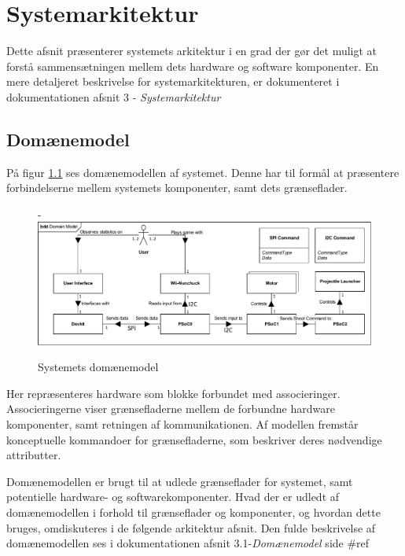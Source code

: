 \chapter{Systemarkitektur}
Dette afsnit præsenterer systemets arkitektur i en grad der gør det muligt at forstå sammensætningen mellem dets hardware og software komponenter. En mere detaljeret beskrivelse for systemarkitekturen, er dokumenteret i dokumentationen afsnit 3 - \textit{Systemarkitektur}

\section{Domænemodel}
På figur \ref{figure:domainModel} ses domænemodellen af systemet. Denne har til formål at præsentere forbindelserne mellem systemets komponenter, samt dets grænseflader.

\begin{figure}[H]
	\begin{adjustwidth}{-2cm}{-\rightmargin}
		\centering
		\includegraphics[width=0.75\paperwidth]{SystemArkitektur/images/domainModel}
		\caption{Systemets domænemodel}
		\label{figure:domainModel}
	\end{adjustwidth}
\end{figure}

\noindent Her repræsenteres hardware som blokke forbundet med associeringer. Associeringerne viser grænsefladerne mellem de forbundne hardware komponenter, samt retningen af kommunikationen. Af modellen fremstår konceptuelle kommandoer for grænsefladerne, som beskriver deres nødvendige attributter. \newline

\noindent Domænemodellen er brugt til at udlede grænseflader for systemet, samt potentielle hardware- og softwarekomponenter. Hvad der er udledt af domænemodellen i forhold til grænseflader og komponenter, og hvordan dette bruges, omdiskuteres i de følgende arkitektur afsnit. Den fulde beskrivelse af domænemodellen ses i dokumentationen afsnit 3.1-\textit{Domænemodel} side \#ref

